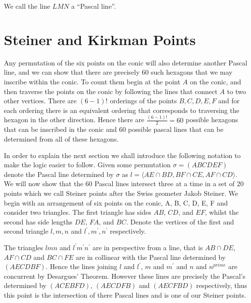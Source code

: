 \documentclass[
10pt, %
a4paper, %
oneside, %
headinclude,footinclude, %
BCOR5mm, %
]{scrartcl}
\begin{document}
We call the line \(LMN\) a ``Pascal line''.

\section{Steiner and Kirkman Points}

Any permutation of the six points on the conic will also determine another Pascal line, and we can show that there are precisely 60 such hexagons that we may inscribe within the conic.
To count them begin at the point \(A\) on the conic, and then traverse the points on the conic by following the lines that connect \(A\) to two other vertices. There are \((6 - 1)!\) orderings of the points \(B, C, D, E, F\) and for each ordering there is an equivalent ordering that
corresponds to traversing the hexagon in the other direction. Hence there are \(\frac{\left( 6 - 1 \right)!}{2} = 60\) possible hexagons that can be inscribed in the conic and \(60\) possible pascal lines that can be determined from all of these hexagons.

%
%

In order to explain the next section we shall introduce the following notation to make the logic easier to follow. Given some permutation \(\sigma = \left( A B C D E F \right)\) denote the Pascal line determined by \(\sigma\) as \(l = \langle AE \cap BD, BF \cap CE, AF \cap CD \rangle\).
We will now show that the 60 Pascal lines intersect three at a time in a set of 20 points which we call Steiner points after the Swiss geometer Jakob Steiner. We begin with an arrangement of six points on the conic, A, B, C, D, E, F and consider two triangles. The first triangle has sides \(AB\), \(CD\), and \(EF\), whilst the second has side lengths \(DE\), \(FA\), and \(BC\).
Denote the vertices of the first and second triangle \(l, m, n\) and \(l^{\prime}, m^{\prime}, n^{\prime}\) respectively.

%
%

The triangles \(lmn\) and \(l^{\prime}m^{\prime}n^{\prime}\) are in perspective from a line, that is \(AB \cap DE\), \(AF \cap CD\) and \(BC \cap FE\) are in collinear with the Pascal line determined by \(\left( A E C D B F \right)\). Hence the lines joining \(l\) and \(l^{\prime}\), \(m\) and \(m^{\prime}\) and \(n\) and \(n^{prime}\) are concurrent by Desargues' Theorem.
However these lines are precisely the Pascal's determined by \(\left( A C E B F D \right)\), \(\left( A E C D F B \right)\) and \(\left( A E C F B D \right)\) respectively, thus this point is the intersection of there Pascal lines and is one of our Steiner points.
\end{document}
